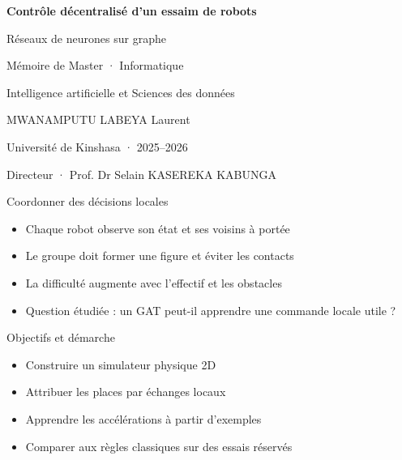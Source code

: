 \documentclass[aspectratio=169,11pt]{beamer}
\begin{document}
\begin{frame}[plain]
\relax
{\LARGE\bfseries Contrôle décentralisé d’un essaim de robots\par}\vspace{5mm}
Réseaux de neurones sur graphe\par\vspace{2mm}
Mémoire de Master · Informatique\par\vspace{2mm}
Intelligence artificielle et Sciences des données\par\vspace{2mm}
MWANAMPUTU LABEYA Laurent\par\vspace{2mm}
Université de Kinshasa · 2025–2026\par\vspace{2mm}
Directeur · Prof. Dr Selain KASEREKA KABUNGA\par\vspace{2mm}
\end{frame}

\begin{frame}{Coordonner des décisions locales}
\begin{itemize}\setlength{\itemsep}{4mm}
\item Chaque robot observe son état et ses voisins à portée
\item Le groupe doit former une figure et éviter les contacts
\item La difficulté augmente avec l’effectif et les obstacles
\item Question étudiée : un GAT peut-il apprendre une commande locale utile ?
\end{itemize}
\end{frame}

\begin{frame}{Objectifs et démarche}
\begin{itemize}\setlength{\itemsep}{4mm}
\item Construire un simulateur physique 2D
\item Attribuer les places par échanges locaux
\item Apprendre les accélérations à partir d’exemples
\item Comparer aux règles classiques sur des essais réservés
\end{itemize}
\end{frame}
\end{document}
